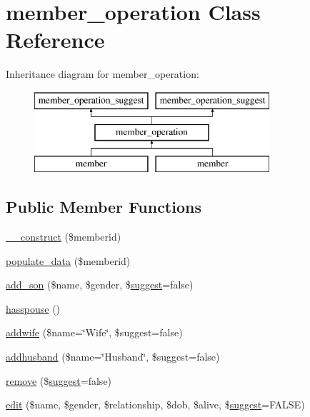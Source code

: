 \hypertarget{classmember__operation}{\section{member\-\_\-operation Class Reference}
\label{classmember__operation}
}
Inheritance diagram for member\-\_\-operation\-:\begin{figure}[H]
\begin{center}
\leavevmode
\includegraphics[height=3.000000cm]{classmember__operation}
\end{center}
\end{figure}
\subsection*{Public Member Functions}
\begin{DoxyCompactItemize}
\item 
\hyperlink{classmember__operation_a6878b5586bd9ea7e86c0ec19750437ca}{\-\_\-\-\_\-construct} (\$memberid)
\item 
\hyperlink{classmember__operation_aaae269a6cda847ad7aaffad933fe0ee6}{populate\-\_\-data} (\$memberid)
\item 
\hyperlink{classmember__operation_a6262e1076fe11fe6c0ef4311bfb79ac7}{add\-\_\-son} (\$name, \$gender, \$\hyperlink{classsuggest}{suggest}=false)
\item 
\hyperlink{classmember__operation_ad769e90d19b213f2d74966d5c1ea2af3}{hasspouse} ()
\item 
\hyperlink{classmember__operation_a98d050cd93cb97b426d8971a827159b1}{addwife} (\$name=\char`\"{}Wife\char`\"{}, \$suggest=false)
\item 
\hyperlink{classmember__operation_adc35cdeaaa4979bf5b8d602dd4f2b529}{addhusband} (\$name=\char`\"{}Husband\char`\"{}, \$suggest=false)
\item 
\hyperlink{classmember__operation_ac684b0752ce7aeafd21aab1aed081711}{remove} (\$\hyperlink{classsuggest}{suggest}=false)
\item 
\hyperlink{classmember__operation_ada4a29c07083c0b2986e5960ef223bed}{edit} (\$name, \$gender, \$relationship, \$dob, \$alive, \$\hyperlink{classsuggest}{suggest}=F\-A\-L\-S\-E)
\end{DoxyCompactItemize}
